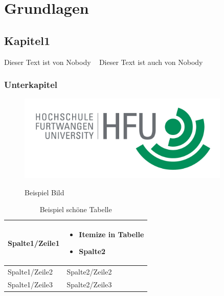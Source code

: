 \chapter{Grundlagen}

\section{Kapitel1}

Dieser Text ist von Nobody ~\cite{Nobody06}
Dieser Text ist auch von Nobody \cite{Nobody16}
\subsection{Unterkapitel}


\begin{figure}[htb!]
	\caption{Beispiel Bild}
	\includegraphics[width=0.9\textwidth]{content/pictures/hfu.jpg}
	\label{pic:label}
\end{figure}


\begin{footnotesize}
	\begin{longtable}[l]{|p{}|p{}|}
		\caption{Beispiel schöne Tabelle}
		\label{tab:label}
		\\
		\hline
		Spalte1/Zeile1	& 
		\begin{itemize}
			\item Itemize in Tabelle
			\item Spalte2
		\end{itemize} 
		\\ 
		\hline
		Spalte1/Zeile2	&   
		Spalte2/Zeile2
		\\
		\hline
		Spalte1/Zeile3	&    
		Spalte2/Zeile3
		\\
		\hline
	\end{longtable}
\end{footnotesize}

